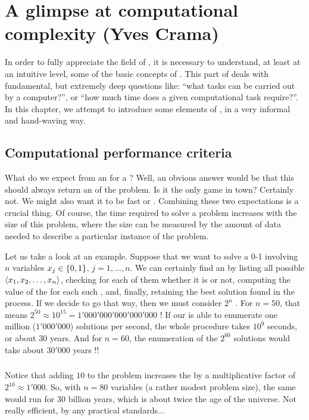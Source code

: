 \chapter{A glimpse at computational complexity (Yves Crama)}
In order to fully appreciate the field of , it is necessary to understand, at least at an intuitive level, some of the basic concepts of . This part of  deals with fundamental, but extremely deep questions like: ``what tasks can be carried out by a computer?'', or ``how much time does a given computational task require?''. In this chapter, we attempt to introduce some elements of , in a very informal and hand-waving way.

\section{Computational performance criteria}
What do we expect from an  for a ? Well, an obvious answer would be that this  should always return an  of the problem. Is it the only game in town? Certainly not. We might also want it to be fast or . Combining these two expectations is a crucial thing. Of course, the time required to solve a problem increases with the size of this problem,  where the size can be measured by the amount of data needed to describe a particular instance of the problem.

\begin{example}
Let us take a look at an example. Suppose that we want to solve a 0-1  involving $n$ variables $x_j\in\left\{ 0,1 \right\}$, $j=1,\ldots,n$. We can certainly find an  by listing all possible  $\left\langle x_1,x_2,\ldots,x_n \right\rangle$, checking for each of them whether it is  or not, computing the value of the  for each such , and, finally, retaining the best solution found in the process. If we decide to go that way, then we must consider $2^n$ . For $n=50$, that means $2^{50}\approx 10^{15}=1'000'000'000'000'000$ ! If our  is able to enumerate one million ($1'000'000$) solutions per second, the whole procedure takes $10^9$ seconds, or about $30$ years. And for $n=60$, the enumeration of the $2^{60}$ solutions would take about $30'000$ years !!

\paragraph{}
Notice that adding $10$  to the problem increases the  by a multiplicative factor of $2^{10}\approx1'000$. So, with $n=80$ variables (a rather modest problem size), the same  would run for $30$ billion years, which is about twice the age of the universe. Not really efficient, by any practical standards...
\end{example}

